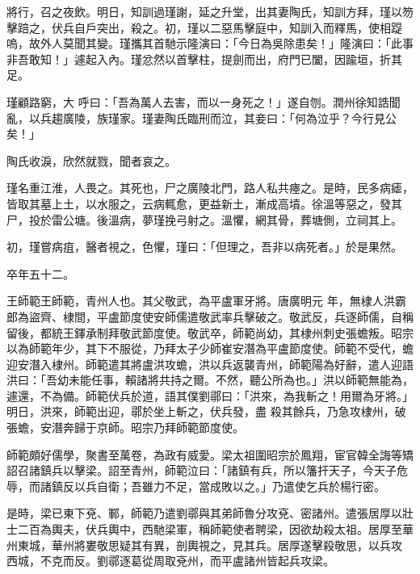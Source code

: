 \begin{pinyinscope}
 將行，召之夜飲。明日，知訓過瑾謝，延之升堂，出其妻陶氏，知訓方拜，瑾以笏擊踣之，伏兵自戶突出，殺之。初，瑾以二惡馬擊庭中，知訓入而釋馬，使相踶嗚，故外人莫聞其變。瑾攜其首馳示隆演曰：「今日為吳除患矣！」隆演曰：「此事非吾敢知！」遽起入內。瑾忿然以首擊柱，提劍而出，府門已闔，因踰垣，折其足。



 瑾顧路窮，大
 呼曰：「吾為萬人去害，而以一身死之！」遂自刎。潤州徐知誥聞亂，以兵趨廣陵，族瑾家。瑾妻陶氏臨刑而泣，其妾曰：「何為泣乎？今行見公矣！」



 陶氏收淚，欣然就戮，聞者哀之。



 瑾名重江淮，人畏之。其死也，尸之廣陵北門，路人私共瘞之。是時，民多病瘧，皆取其墓上土，以水服之，云病輒愈，更益新土，漸成高墳。徐溫等惡之，發其尸，投於雷公塘。後溫病，夢瑾挽弓射之。溫懼，網其骨，葬塘側，立祠其上。



 初，瑾嘗病疽，醫者視之，色懼，瑾曰：「但理之，吾非以病死者。」於是果然。



 卒年五十二。



 王師範王師範，青州人也。其父敬武，為平盧軍牙將。唐廣明元
 年，無棣人洪霸郎為盜齊、棣間，平盧節度使安師儒遣敬武率兵擊破之。敬武反，兵逐師儒，自稱留後，都統王鐸承制拜敬武節度使。敬武卒，師範尚幼，其棣州刺史張蟾叛。昭宗以為師範年少，其下不服從，乃拜太子少師崔安潛為平盧節度使。師範不受代，蟾迎安潛入棣州。師範遣其將盧洪攻蟾，洪以兵返襲青州，師範陽為好辭，遣人迎語洪曰：「吾幼未能任事，賴諸將共持之爾。不然，聽公所為也。」洪以師範無能為，遽還，不為備。師範伏兵於道，語其僕劉鄩曰：「洪來，為我斬之！用爾為牙將。」明日，洪來，師範出迎，鄩於坐上斬之，伏兵發，盡
 殺其餘兵，乃急攻棣州，破張蟾，安潛奔歸于京師。昭宗乃拜師範節度使。



 師範頗好儒學，聚書至萬卷，為政有威愛。梁太祖圍昭宗於鳳翔，宦官韓全誨等矯詔召諸鎮兵以擊梁。詔至青州，師範泣曰：「諸鎮有兵，所以籓扞天子，今天子危辱，而諸鎮反以兵自衛；吾雖力不足，當成敗以之。」乃遣使乞兵於楊行密。



 是時，梁已東下兗、鄆，師範乃遣劉鄩與其弟師魯分攻兗、密諸州。遣張居厚以壯士二百為輿夫，伏兵輿中，西馳梁軍，稱師範使者聘梁，因欲劫殺太祖。居厚至華州東城，華州將婁敬思疑其有異，剖輿視之，見其兵。居厚遂擊殺敬思，以兵攻
 西城，不克而反。劉鄩逐葛從周取兗州，而平盧諸州皆起兵攻梁。




\end{pinyinscope}
